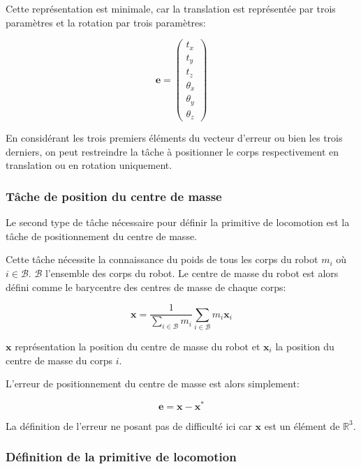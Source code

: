 Cette représentation est minimale, car la translation est représentée
par trois paramètres et la rotation par trois paramètres:

\begin{equation}
  \mathbf{e} = \left(
  \begin{array}{c}
    t_x\\
    t_y\\
    t_z\\
    \theta_x\\
    \theta_y\\
    \theta_z
  \end{array}
  \right)
\end{equation}

En considérant les trois premiers éléments du vecteur d'erreur ou bien
les trois derniers, on peut restreindre la tâche à positionner le corps
respectivement en translation ou en rotation uniquement.


\subsubsection{Tâche de position du centre de masse}


Le second type de tâche nécessaire pour définir la primitive de
locomotion est la tâche de positionnement du centre de masse.

Cette tâche nécessite la connaissance du poids de tous les corps du
robot $m_i$ où $i \in \mathcal{B}$. $\mathcal{B}$ l'ensemble des corps
du robot. Le centre de masse du robot est alors
défini comme le barycentre des centres de masse de chaque corps:

\begin{equation}
  \mathbf{x} = \frac{1}{\sum_{i \in \mathcal{B}} m_i} \sum_{i \in \mathcal{B}} m_i \mathbf{x}_i
\end{equation}

$\mathbf{x}$ représentation la position du centre de masse du robot et
$\mathbf{x}_i$ la position du centre de masse du corps $i$.

L'erreur de positionnement du centre de masse est alors simplement:

\begin{equation}
  \mathbf{e} = \mathbf{x} - \mathbf{x}^{*}
\end{equation}

La définition de l'erreur ne posant pas de difficulté ici car
$\mathbf{x}$ est un élément de $\mathbb{R}^3$.


\subsubsection{Définition de la primitive de locomotion}

